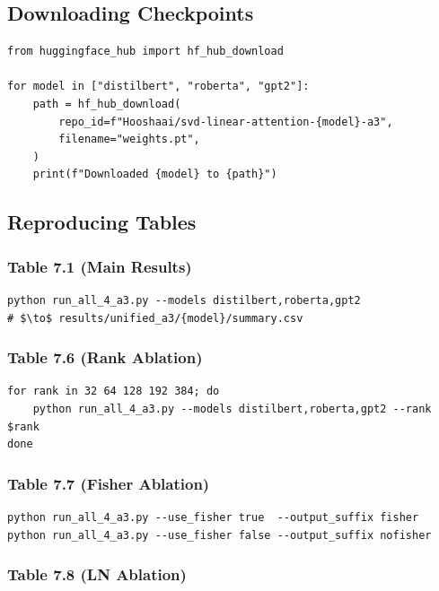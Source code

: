 \subsection{Downloading Checkpoints}

\begin{lstlisting}
from huggingface_hub import hf_hub_download

for model in ["distilbert", "roberta", "gpt2"]:
    path = hf_hub_download(
        repo_id=f"Hooshaai/svd-linear-attention-{model}-a3",
        filename="weights.pt",
    )
    print(f"Downloaded {model} to {path}")
\end{lstlisting}

\subsection{Reproducing Tables}

\subsubsection{Table 7.1 (Main Results)}

\begin{lstlisting}
python run_all_4_a3.py --models distilbert,roberta,gpt2
# $\to$ results/unified_a3/{model}/summary.csv
\end{lstlisting}

\subsubsection{Table 7.6 (Rank Ablation)}

\begin{lstlisting}
for rank in 32 64 128 192 384; do
    python run_all_4_a3.py --models distilbert,roberta,gpt2 --rank $rank
done
\end{lstlisting}

\subsubsection{Table 7.7 (Fisher Ablation)}

\begin{lstlisting}
python run_all_4_a3.py --use_fisher true  --output_suffix fisher
python run_all_4_a3.py --use_fisher false --output_suffix nofisher
\end{lstlisting}

\subsubsection{Table 7.8 (LN Ablation)}

